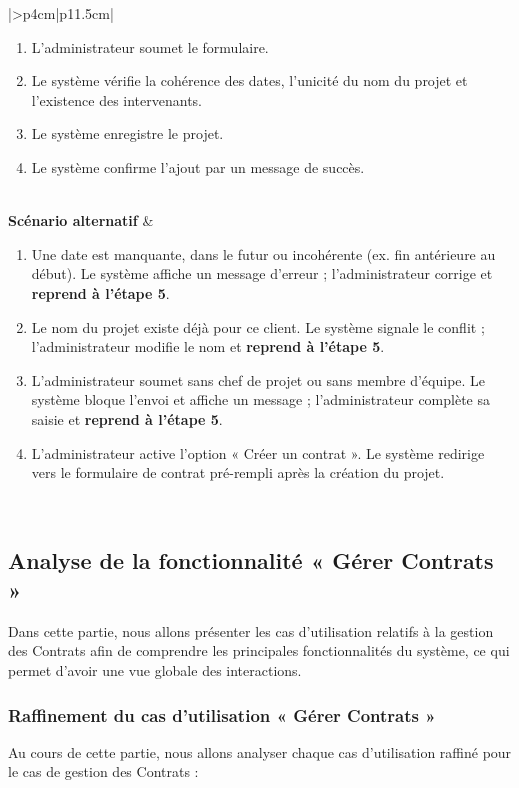 \begin{longtable}{|>{}p{4cm}|p{11.5cm}|}
\begin{minipage}[t]{\linewidth}
\begin{enumerate}[label=\arabic*., nosep,leftmargin=0.6cm,topsep=0pt,itemsep=1pt,resume=scen_auth]
\item L'administrateur soumet le formulaire.
\item Le système vérifie la cohérence des dates, l'unicité du nom du projet et l'existence des intervenants.
\item Le système enregistre le projet.
\item Le système confirme l'ajout par un message de succès.
\end{enumerate}
\vspace{0.1cm}
\end{minipage} \\
\hline
\textbf{Scénario alternatif} &
\begin{enumerate}[label=A\arabic*.,nosep,leftmargin=0.6cm,topsep=0pt,itemsep=1pt]
\item Une date est manquante, dans le futur ou incohérente (ex. fin antérieure au début). Le système affiche un message d'erreur ; l'administrateur corrige et \textbf{reprend à l'étape 5}.
\item Le nom du projet existe déjà pour ce client. Le système signale le conflit ; l'administrateur modifie le nom et \textbf{reprend à l'étape 5}.
\item L'administrateur soumet sans chef de projet ou sans membre d'équipe. Le système bloque l'envoi et affiche un message ; l'administrateur complète sa saisie et \textbf{reprend à l'étape 5}.
\item L'administrateur active l'option « Créer un contrat ». Le système redirige vers le formulaire de contrat pré-rempli après la création du projet.
\end{enumerate} \\
\hline
\end{longtable}
\normalsize

\subsection{Analyse de la fonctionnalité « Gérer Contrats »}

Dans cette partie, nous allons présenter les cas d'utilisation relatifs à la gestion des Contrats afin de comprendre
les principales fonctionnalités du système, ce qui permet d'avoir une vue globale des interactions.
\subsubsection{Raffinement du cas d'utilisation « Gérer Contrats »}
Au cours de cette partie, nous allons analyser chaque cas d'utilisation raffiné pour le cas de gestion des Contrats :

